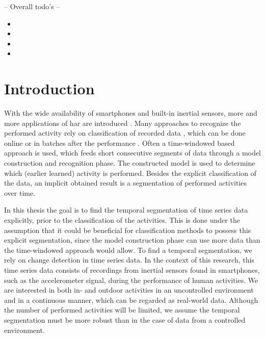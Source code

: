 
-- Overall todo's --
\begin{itemize}
  \item {}
  \item {}
  \item {}
  \item {}
\end{itemize}

\chapter{Introduction}

\label{Chapter1} %


With the wide availability of smartphones and built-in inertial sensors, more and more applications of \gls{har} are introduced \cite{avci2010activity,derawi2010accelerometer,guenterberg2009distributed}.
Many approaches to recognize the performed activity rely on classification of recorded data \cite{devaul2001real,ward2006activity,yang2008using,anguita2012human,bao2004activity,bernecker2012activity,he2008activity}, which can be done online or in batches after the performance \cite{duque2012offline}.
Often a time-windowed based approach is used, which feeds short consecutive segments of data through a model construction and recognition phase.
The constructed model is used to determine which (earlier learned) activity is performed.
Besides the explicit classification of the data, an implicit obtained result is a segmentation of performed activities over time.

In this thesis the goal is to find the temporal segmentation of time series data explicitly, prior to the classification of the activities.
This is done under the assumption that it could be beneficial for classification methods to possess this explicit segmentation, since the model construction phase can use more data than the time-windowed approach would allow.
To find a temporal segmentation, we rely on change detection in time series data.
In the context of this research, this time series data consists of recordings from inertial sensors found in smartphones, such as the accelerometer signal, during the performance of human activities.
We are interested in both in- and outdoor activities in an uncontrolled environment and in a continuous manner, which can be regarded as real-world data.
Although the number of performed activities will be limited, we assume the temporal segmentation must be more robust than in the case of data from a controlled environment.

